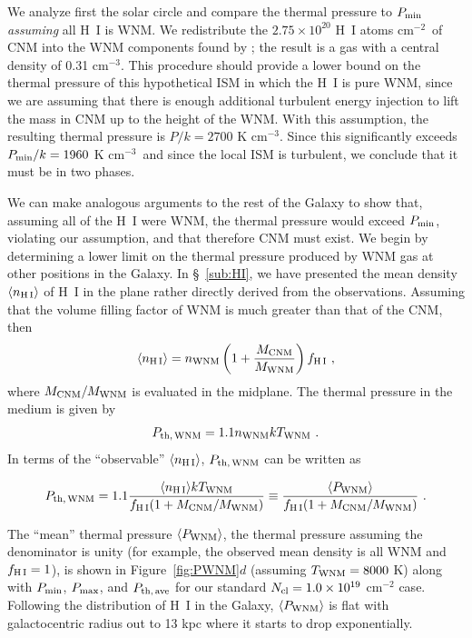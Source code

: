 \documentclass[12pt,preprint,flushrt]{aastex}
\newcommand{\beq}{\begin{equation}}
\newcommand{\eeq}{\end{equation}}
\newcommand{\ee}{$^{-2}$}
\newcommand{\eee}{$^{-3}$}
\newcommand{\pmax}{P_{\rm max}}
\newcommand{\pmin}{P_{\rm min}}
\newcommand{\pthave}{P_{\rm th,\,ave}}
\begin{document}
We analyze first the solar circle and compare the thermal pressure to $\pmin$
{\em assuming} all H~I is WNM.
We redistribute the $2.75\times 10^{20}$
H~I atoms cm\ee\ of CNM into the WNM components found by
\cite{dic90}; the result is a gas with a central density
of 0.31 cm\eee.  
This procedure should provide a lower bound on the thermal
pressure of this hypothetical ISM in which the H~I is pure WNM, since we are
assuming that there is enough additional turbulent energy injection to lift
the mass in CNM up to the height of the WNM.  With this assumption,
the resulting thermal pressure 
is $P/k=2700$ K cm\eee.  Since this significantly exceeds 
$P_{\rm min}/k=1960$ K cm\eee\ and since the local ISM is turbulent,
we conclude that it must be in two phases.

We can make analogous arguments to the rest of the Galaxy to show
that, assuming all of the H~I were WNM, the thermal pressure
would exceed $\pmin$, violating our assumption, and that therefore
CNM must exist. We begin by determining a lower limit 
on the thermal pressure produced by
WNM gas at other positions in the Galaxy.
In \S~\ref{sub:HI}, we have presented the mean density 
$\langle n_{\rm H\, I} \rangle$ of 
H~I in the plane
rather directly derived from the observations.  Assuming that the volume
filling factor of WNM is much greater than that of the CNM,
then
\beq
    \langle n_{\rm H\, I} \rangle = n_{\rm WNM} 
         \left( 1 + \frac{M_{\rm CNM}}{M_{\rm WNM}} \right) 
          f_{\rm H\, I}\,\, ,
\eeq
where $M_{\rm CNM}/M_{\rm WNM}$ is evaluated in the midplane.
The thermal pressure in the medium is given by
\beq
    P_{\rm th,\, WNM} = 1.1 n_{\rm WNM} k T_{\rm WNM}\,\, .
\eeq
In terms of the ``observable'' $\langle n_{\rm H\, I} \rangle$, 
$P_{\rm th,\, WNM}$ can be written as

\beq
    P_{\rm th,\, WNM} =  
1.1 \frac{\langle n_{\rm H\, I} \rangle  k T_{\rm WNM}}
  {f_{\rm H\, I} (1 + M_{\rm CNM}/M_{\rm WNM} )} \equiv 
   \frac{ \langle P_{\rm WNM} \rangle}
    {f_{\rm H\, I} (1 + M_{\rm CNM}/M_{\rm WNM} )} \,\, .
\eeq

The ``mean'' thermal pressure $\langle P_{\rm WNM} \rangle$, the
thermal pressure assuming the 
denominator is unity (for example, the 
observed mean density is all WNM and $f_{\rm H\, I} = 1$), 
is shown in Figure~\ref{fig:PWNM}$d$ (assuming $T_{\rm WNM} = 8000$ K)
along with
$\pmin$, $\pmax$, and $\pthave$ for our standard $N_{\rm cl} = 1.0\times
10^{19}$ cm$^{-2}$ case.
Following the distribution
of H~I in the Galaxy, $\langle P_{\rm WNM} \rangle$
is flat with galactocentric
radius out to 13 kpc where it starts to drop exponentially. 
\end{document}
